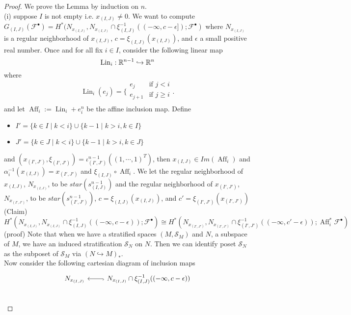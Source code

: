 \begin{proof}
We prove the Lemma by induction on $n$.\\
(i) suppose $I$ is not empty i.e. $x_{(I,J)} \neq 0$. We want to compute $G_{(I,J)}(\mathscr{F}^\bullet) = H^*(N_{x_{(I,J)}}, N_{x_{(I,J)}} \cap \xi_{(I,J)}^{-1}((-\infty,c-\epsilon]); \mathscr{F}^\bullet)$ where $N_{x_{(I,J)}}$ is a regular neighborhood of $x_{(I,J)}$, $c = \xi_{(I,J)}(x_{(I,J)})$, and $\epsilon$ a small positive real number. Once and for all fix $i\in I$, consider the following linear map
\[
\operatorname{Lin}_i : \mathbb{R}^{n-1} \hookrightarrow \mathbb{R}^n
\]
where
\[\operatorname{Lin}_i(e_j)=\bigg\{
\begin{array}{ll}
    e_j & \text{if } j < i \\
	e_{j+1} & \text{if } j \geq i \\
\end{array}
\bigg.
\] 
and let $\operatorname{Aff}_i := \operatorname{Lin}_i + e^n_i$ be the affine inclusion map. Define 
\begin{itemize}
\item $I' = \{k\in I \mid k<i\} \cup \{k-1 \mid k>i, k\in I\}$
\item $J' = \{k\in J \mid k<i\} \cup \{k-1 \mid k>i, k\in J\}$
\end{itemize}
and $(x_{(I',J')}, \xi_{(I',J')}) = \iota^{n-1}_{(I',J')}((1,\cdots,1)^T)$, then $x_{(I,J)} \in Im(\operatorname{Aff}_i)$ and $\alpha_i^{-1}(x_{(I,J)})=x_{(I',J')} $ and $\xi_{(I,J)} \circ \operatorname{Aff}_i$. We let the regular neighborhood of $x_{(I,J)}$, $N_{x_{(I,J)}}$, to be $star(s^{n-1}_{(I,J)})$ and the regular neighborhood of $x_{(I',J')}$, $N_{x_{(I',J')}}$, to be $star(s^{n-1}_{(I',J')})$, $c = \xi_{(I,J)}(x_{(I,J)})$, and $c' = \xi_{(I',J')}(x_{(I',J')})$\\
(Claim) $H^*(N_{x_{(I,J)}}, N_{x_{(I,J)}}\cap \xi_{(I,J)}^{-1}((-\infty, c-\epsilon)); \mathscr{F}^\bullet) \cong H^*(N_{x_{(I',J')}}, N_{x_{(I',J')}}\cap \xi_{(I',J')}^{-1}((-\infty, c'-\epsilon)); \operatorname{Aff}_i^*\mathscr{F}^\bullet)$\\
(proof) Note that when we have a stratified spaces $(M,\mathcal{S}_M)$ and $N$, a subspace of $M$, we have an induced stratification $\mathcal{S}_N$ on $N$. Then we can identify poset $\mathcal{S}_N$ as the subposet of $\mathcal{S}_M$ via $(N\hookrightarrow M)_*$.\\
Now consider the following cartesian diagram of inclusion maps
\[
\begin{tikzcd}
N_{x_{(I,J)}}   & N_{x_{(I,J)}} \cap \xi_{(I,J)}^{-1}((-\infty,c-\epsilon))\arrow[l, hook] \\

\end{tikzcd}\]
\end{proof}
